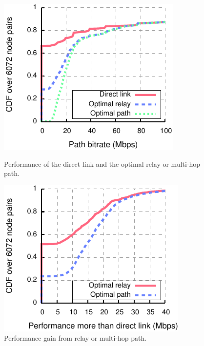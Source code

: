 \begin{figure}[t]
\begin{minipage}{0.48\textwidth}
	\centering
	\includegraphics[width=\textwidth]{figures/applications/relay_gains.pdf}
	\caption[Performance of the direct link and the multi-hop paths]{\label{fig:relay_sel_gains}Performance of the direct link and the optimal relay or multi-hop path.}
\end{minipage}
\hfill
\begin{minipage}{0.48\textwidth}
	\centering
	\includegraphics[width=\textwidth]{figures/applications/relay_gains_mbps.pdf}
	\caption[Performance gain from multi-hop paths]{\label{fig:relay_sel_gains_mbps}Performance gain from relay or multi-hop path.}
\end{minipage}
\end{figure}

